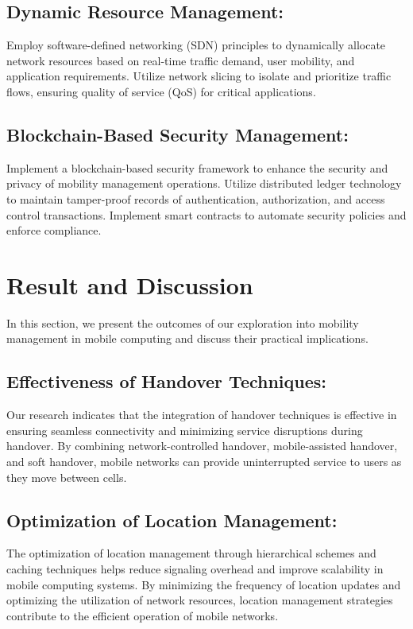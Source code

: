 \documentclass[12pt]{report}
\begin{document}
\subsection*{Dynamic Resource Management:} Employ software-defined networking (SDN) principles to dynamically allocate network resources based on real-time traffic demand, user mobility, and application requirements. Utilize network slicing to isolate and prioritize traffic flows, ensuring quality of service (QoS) for critical applications.\cite{models}
\subsection*{Blockchain-Based Security Management:}  Implement a blockchain-based security framework to enhance the security and privacy of mobility management operations. Utilize distributed ledger technology to maintain tamper-proof records of authentication, authorization, and access control transactions. Implement smart contracts to automate security policies and enforce compliance.




\newpage
\section*{Result and Discussion}
In this section, we present the outcomes of our exploration into mobility management in mobile computing and discuss their practical\cite{future} implications.

\subsection*{Effectiveness of Handover Techniques: } Our research indicates that the integration of handover techniques is effective in ensuring seamless connectivity and minimizing service disruptions during handover. By combining network-controlled handover, mobile-assisted handover, and soft handover, mobile networks can provide uninterrupted service to users as they move between cells.\cite{mobility}
\subsection*{Optimization of Location Management:} The optimization of location management\cite{systems} through hierarchical schemes and caching techniques helps reduce signaling overhead and improve scalability in mobile computing systems. By minimizing the frequency of location updates and optimizing the utilization of network resources, location management strategies contribute to the efficient operation of mobile networks.
\end{document}
